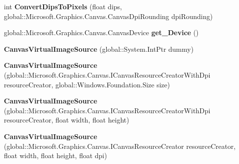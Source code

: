 \begin{DoxyCompactItemize}
int {\bfseries Convert\+Dips\+To\+Pixels} (float dips, global\+::\+Microsoft.\+Graphics.\+Canvas.\+Canvas\+Dpi\+Rounding dpi\+Rounding)
\item 
\mbox{\label{class_microsoft_1_1_graphics_1_1_canvas_1_1_u_i_1_1_xaml_1_1_canvas_virtual_image_source_ab39af3b2bc0d7f39323c02fd27ab2531}} 
global\+::\+Microsoft.\+Graphics.\+Canvas.\+Canvas\+Device {\bfseries get\+\_\+\+Device} ()
\item 
\mbox{\label{class_microsoft_1_1_graphics_1_1_canvas_1_1_u_i_1_1_xaml_1_1_canvas_virtual_image_source_a514d9c30fbd43794543c3c86f1f45471}} 
{\bfseries Canvas\+Virtual\+Image\+Source} (global\+::\+System.\+Int\+Ptr dummy)
\item 
\mbox{\label{class_microsoft_1_1_graphics_1_1_canvas_1_1_u_i_1_1_xaml_1_1_canvas_virtual_image_source_aebcca3188e39dcafae53146219d289c9}} 
{\bfseries Canvas\+Virtual\+Image\+Source} (global\+::\+Microsoft.\+Graphics.\+Canvas.\+I\+Canvas\+Resource\+Creator\+With\+Dpi resource\+Creator, global\+::\+Windows.\+Foundation.\+Size size)
\item 
\mbox{\label{class_microsoft_1_1_graphics_1_1_canvas_1_1_u_i_1_1_xaml_1_1_canvas_virtual_image_source_a8b810e5a0a07f77ef3ac71a77e4bb2b9}} 
{\bfseries Canvas\+Virtual\+Image\+Source} (global\+::\+Microsoft.\+Graphics.\+Canvas.\+I\+Canvas\+Resource\+Creator\+With\+Dpi resource\+Creator, float width, float height)
\item 
\mbox{\label{class_microsoft_1_1_graphics_1_1_canvas_1_1_u_i_1_1_xaml_1_1_canvas_virtual_image_source_ae338bb104e07429d6161b64bada335db}} 
{\bfseries Canvas\+Virtual\+Image\+Source} (global\+::\+Microsoft.\+Graphics.\+Canvas.\+I\+Canvas\+Resource\+Creator resource\+Creator, float width, float height, float dpi)
\item 
\mbox{\label{class_microsoft_1_1_graphics_1_1_canvas_1_1_u_i_1_1_xaml_1_1_canvas_virtual_image_source_a8b703980e00fce9ea6161cf83fea05af}} 

\end{DoxyCompactItemize}
